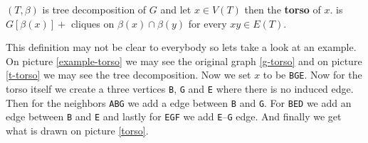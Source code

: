 \begin{defn}
	$(T, \beta)$ is tree decomposition of $G$ and let $x \in V(T)$ then the \textbf{torso} of $x$. is $G[\beta(x)] + $ cliques on $\beta(x) \cap \beta(y)$ for every $xy \in E(T)$.
\end{defn}

This definition may not be clear to everybody so lets take a look at an example. On picture \ref{example-torso} we may see the original graph \ref{g-torso} and on picture \ref{t-torso} we may see the tree decomposition. Now we set $x$ to be \texttt{\textcolor{mygreen}{B}\textcolor{myorange}{G}\textcolor{myblue}{E}}. Now for the torso itself we create a three vertices \texttt{B}, \texttt{G} and \texttt{E} where there is no induced edge. Then for the neighbors \texttt{ABG} we add a edge between \texttt{B} and \texttt{G}. For \texttt{BED} we add an edge between \texttt{B} and \texttt{E} and lastly for \texttt{EGF} we add \texttt{E}--\texttt{G} edge. And finally we get what is drawn on picture \ref{torso}.

